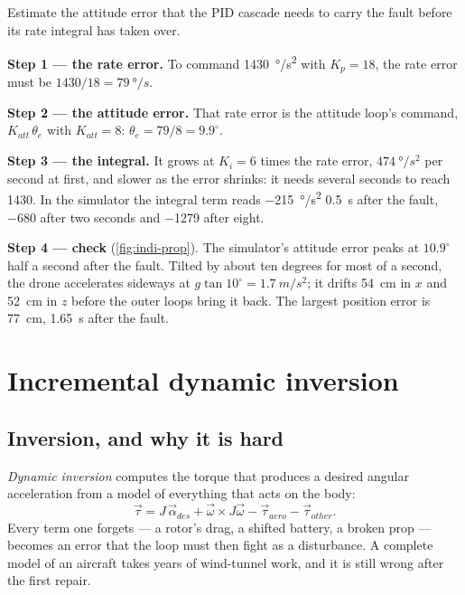 \begin{example}
\label{ex:indi-pid}
Estimate the attitude error that the PID cascade needs to carry the fault before its rate integral has taken over.

\textbf{Step 1 — the rate error.} To command \SI{1430}{\degree/s^2} with $K_p = 18$, the rate error must be $1430/18 = \SI{79}{\degree/s}$.

\textbf{Step 2 — the attitude error.} That rate error is the attitude loop's command, $K_{att}\,\theta_e$ with $K_{att} = 8$: $\theta_e = 79/8 = 9.9^\circ$.

\textbf{Step 3 — the integral.} It grows at $K_i = 6$ times the rate error, $\SI{474}{\degree/s^2}$ per second at first, and slower as the error shrinks: it needs several seconds to reach 1430. In the simulator the integral term reads \SI{-215}{\degree/s^2} \SI{0.5}{s} after the fault, \SI{-680}{} after two seconds and \SI{-1279}{} after eight.

\textbf{Step 4 — check} (\cref{fig:indi-prop}). The simulator's attitude error peaks at $10.9^\circ$ half a second after the fault. Tilted by about ten degrees for most of a second, the drone accelerates sideways at $g\tan 10^\circ = \SI{1.7}{m/s^2}$; it drifts \SI{54}{cm} in $x$ and \SI{52}{cm} in $z$ before the outer loops bring it back. The largest position error is \SI{77}{cm}, \SI{1.65}{s} after the fault.
\end{example}


\section{Incremental dynamic inversion}

\subsection{Inversion, and why it is hard}
\emph{Dynamic inversion} computes the torque that produces a desired angular acceleration from a model of everything that acts on the body:
\begin{equation}\label{eq:indi-ndi}
  \vec\tau = J\,\vec\alpha_{des} + \vec\omega \times J\vec\omega - \vec\tau_{aero} - \vec\tau_{other} .
\end{equation}
Every term one forgets — a rotor's drag, a shifted battery, a broken prop — becomes an error that the loop must then fight as a disturbance. A complete model of an aircraft takes years of wind-tunnel work, and it is still wrong after the first repair.

